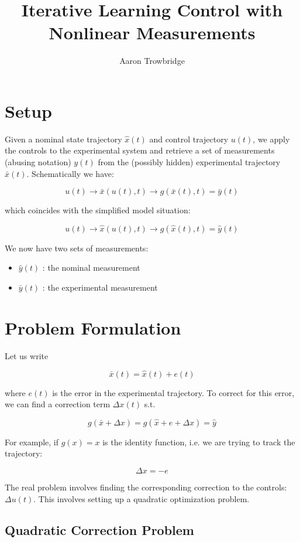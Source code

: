 \documentclass{article}
\title{Iterative Learning Control with \\ Nonlinear Measurements}
\author{Aaron Trowbridge}
\date{}
\begin{document}
\maketitle

\section*{Setup}

Given a nominal state trajectory $\hat{x}(t)$ and control trajectory $u(t)$, we apply the controls to the experimental system and retrieve a set of measurements (abusing notation) $y(t)$ from the (possibly hidden) experimental trajectory $\bar x (t)$. Schematically we have:

$$
u(t) \longrightarrow \bar x (u(t), t) \longrightarrow g(\bar x(t), t) = \bar y(t)
$$

 
which coincides with the simplified model situation:

$$
u(t) \longrightarrow \hat x (u(t), t) \longrightarrow g(\hat x(t), t) = \hat y(t)
$$


We now have two sets of measurements: 

\begin{itemize}
  \item $\hat y(t)$ : the nominal measurement
  \item $\bar y(t)$ : the experimental measurement
\end{itemize}

\section*{Problem Formulation}

Let us write

$$
\bar x (t) = \hat x (t) + e(t)
$$


where $e(t)$ is the error in the experimental trajectory.  To correct for this error, we can find a correction term $\Delta x(t)$ s.t.

$$
g(\bar x + \Delta x) = g(\hat x + e + \Delta x ) = \hat y
$$

For example, if $g(x) = x$ is the identity function, i.e. we are trying to track the trajectory:

$$
\Delta x = -e 
$$

The real problem involves finding the corresponding correction to the controls: $\Delta u(t)$. This involves setting up a quadratic optimization problem.

\newpage
\subsection*{Quadratic Correction Problem}
\end{document}
